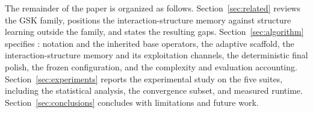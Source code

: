 The remainder of the paper is organized as follows.
Section~\ref{sec:related} reviews the GSK family, positions the
interaction-structure memory against structure learning outside the
family, and states the resulting gaps. Section~\ref{sec:algorithm}
specifies \dtgsk{}: notation and the inherited base operators, the
adaptive scaffold, the interaction-structure memory and its
exploitation channels, the deterministic final polish, the frozen
configuration, and the complexity and evaluation accounting.
Section~\ref{sec:experiments} reports the experimental study on the
five suites, including the statistical analysis, the convergence
subset, and measured runtime. Section~\ref{sec:conclusions} concludes
with limitations and future work.
